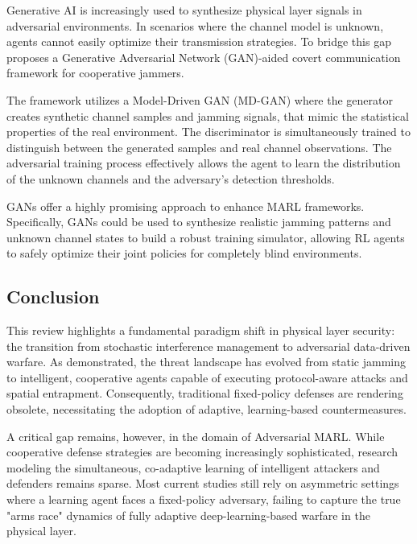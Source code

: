 \documentclass[journal]{IEEEtran}
\newcommand{\adm}[1]{{\color{orange}{[#1]}}}
\newcommand{\rar}[1]{{\color{blue}{[#1]}}}
\begin{document}
Generative AI is increasingly used to synthesize physical layer signals in adversarial environments. \adm{cite} 
In scenarios where the channel model is unknown, agents cannot easily optimize their transmission strategies. 
To bridge this gap~\cite{wen2025generative} proposes a Generative Adversarial Network (GAN)-aided covert communication framework for cooperative jammers.

The framework utilizes a Model-Driven GAN (MD-GAN) where the generator creates synthetic channel samples and jamming signals, that mimic the statistical properties of the real environment. 
The discriminator is simultaneously trained to distinguish between the generated samples and real channel observations. 
The adversarial training process effectively allows the agent to learn the distribution of the unknown channels and the adversary's detection thresholds.

GANs offer a highly promising approach to enhance MARL frameworks.
Specifically, GANs could be used to synthesize realistic jamming patterns and unknown channel states to build a robust training simulator, allowing RL agents to safely optimize their joint policies for completely blind environments.


\subsection{Conclusion} \rar{a whole section is not really needed for related works rather a final paragraph.}
This review highlights a fundamental paradigm shift in physical layer security: the transition from stochastic interference management to adversarial data-driven warfare. 
As demonstrated, the threat landscape has evolved from static jamming to intelligent, cooperative agents capable of executing protocol-aware attacks and spatial entrapment. 
Consequently, traditional fixed-policy defenses are rendering obsolete, necessitating the adoption of adaptive, learning-based countermeasures.

A critical gap remains, however, in the domain of Adversarial MARL. 
While cooperative defense strategies are becoming increasingly sophisticated, research modeling the simultaneous, co-adaptive learning of intelligent attackers and defenders remains sparse. Most current studies still rely on asymmetric settings where a learning agent faces a fixed-policy adversary, failing to capture the true "arms race" dynamics of fully adaptive deep-learning-based warfare in the physical layer.
\end{document}
